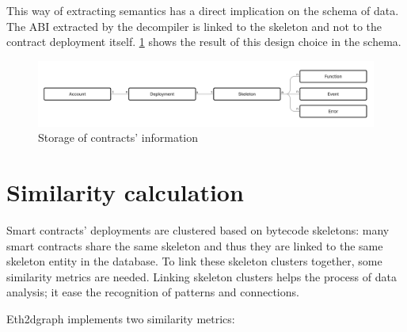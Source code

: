 This way of extracting semantics has a direct implication on the schema of data. The ABI extracted by the decompiler is linked to the skeleton and not to the contract deployment itself. \cref{fig:contracts-storage} shows the result of this design choice in the schema.

\begin{figure}[H]
  \centering
  \includegraphics[width=1\textwidth]{Figures/methods/contracts-storage.jpg}
  \caption[Storage of contracts' information]{Storage of contracts' information}
  \label{fig:contracts-storage}
\end{figure}

\section{Similarity calculation}
\label{similarity-calculation}
Smart contracts' deployments are clustered based on bytecode skeletons: many smart contracts share the same skeleton and thus they are linked to the same skeleton entity in the database. To link these skeleton clusters together, some similarity metrics are needed. Linking skeleton clusters helps the process of data analysis; it ease the recognition of patterns and connections.

Eth2dgraph implements two similarity metrics:

